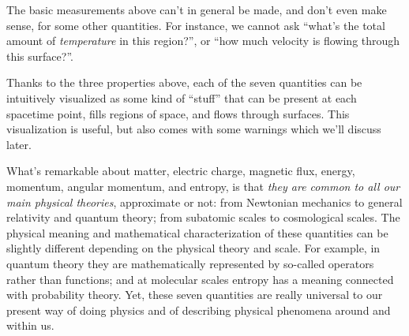 \documentclass[a4paper,12pt,%
onecolumn,oneside,titlepage,%
british%
]{memoir}
\renewcommand*{\|}[1][]{\nonscript\:#1\vert\nonscript\:\mathopen{}}
\begin{document}
\smallskip

The basic measurements above can't in general be made, and don't even make sense, for some other quantities. For instance, we cannot ask \enquote{what's the total amount of \emph{temperature} in this region?}, or \enquote{how much velocity is flowing through this surface?}.

\smallskip

Thanks to the three properties above, each of the seven quantities can be intuitively visualized as some kind of \enquote{stuff} that can be present at each spacetime point, fills regions of space, and flows through surfaces. This visualization is useful, but also comes with some warnings which we'll discuss later.


\smallskip

What's remarkable about matter, electric charge, magnetic flux, energy, momentum, angular momentum, and entropy, is that \emph{they are common to all our main physical theories}, approximate or not: from Newtonian mechanics to general relativity and quantum theory; from subatomic scales to cosmological scales. The physical meaning and mathematical characterization of these quantities can be slightly different depending on the physical theory and scale. For example, in quantum theory they are mathematically represented by so-called operators rather than functions; and at molecular scales entropy has a meaning connected with probability theory. Yet, these seven quantities are really universal to our present way of doing physics and of describing physical phenomena around and within us.

% 
% 
\end{document}
